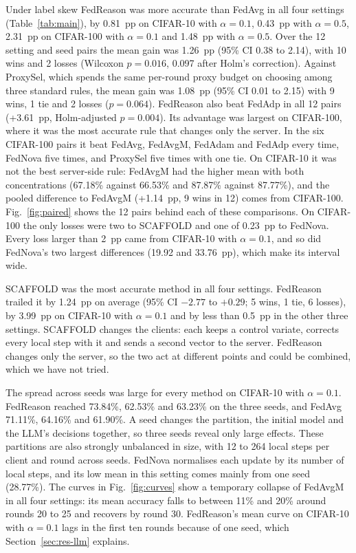 \documentclass[3p,times,a4paper]{elsarticle}
\begin{document}
Under label skew FedReason was more accurate than FedAvg in all four settings (Table~\ref{tab:main}), by 0.81~pp on CIFAR-10 with $\alpha=0.1$, 0.43~pp with $\alpha=0.5$, 2.31~pp on CIFAR-100 with $\alpha=0.1$ and 1.48~pp with $\alpha=0.5$. Over the 12 setting and seed pairs the mean gain was 1.26~pp (95\% CI 0.38 to 2.14), with 10 wins and 2 losses (Wilcoxon $p=0.016$, 0.097 after Holm's correction). Against ProxySel, which spends the same per-round proxy budget on choosing among three standard rules, the mean gain was 1.08~pp (95\% CI 0.01 to 2.15) with 9 wins, 1 tie and 2 losses ($p=0.064$). FedReason also beat FedAdp in all 12 pairs (+3.61~pp, Holm-adjusted $p=0.004$). Its advantage was largest on CIFAR-100, where it was the most accurate rule that changes only the server. In the six CIFAR-100 pairs it beat FedAvg, FedAvgM, FedAdam and FedAdp every time, FedNova five times, and ProxySel five times with one tie. On CIFAR-10 it was not the best server-side rule: FedAvgM had the higher mean with both concentrations (67.18\% against 66.53\% and 87.87\% against 87.77\%), and the pooled difference to FedAvgM (+1.14~pp, 9 wins in 12) comes from CIFAR-100. Fig.~\ref{fig:paired} shows the 12 pairs behind each of these comparisons. On CIFAR-100 the only losses were two to SCAFFOLD and one of 0.23~pp to FedNova. Every loss larger than 2~pp came from CIFAR-10 with $\alpha=0.1$, and so did FedNova's two largest differences (19.92 and 33.76~pp), which make its interval wide.

SCAFFOLD was the most accurate method in all four settings. FedReason trailed it by 1.24~pp on average (95\% CI $-2.77$ to $+0.29$; 5 wins, 1 tie, 6 losses), by 3.99~pp on CIFAR-10 with $\alpha=0.1$ and by less than 0.5~pp in the other three settings. SCAFFOLD changes the clients: each keeps a control variate, corrects every local step with it and sends a second vector to the server. FedReason changes only the server, so the two act at different points and could be combined, which we have not tried.

The spread across seeds was large for every method on CIFAR-10 with $\alpha=0.1$. FedReason reached 73.84\%, 62.53\% and 63.23\% on the three seeds, and FedAvg 71.11\%, 64.16\% and 61.90\%. A seed changes the partition, the initial model and the LLM's decisions together, so three seeds reveal only large effects. These partitions are also strongly unbalanced in size, with 12 to 264 local steps per client and round across seeds. FedNova normalises each update by its number of local steps, and its low mean in this setting comes mainly from one seed (28.77\%). The curves in Fig.~\ref{fig:curves} show a temporary collapse of FedAvgM in all four settings: its mean accuracy falls to between 11\% and 20\% around rounds 20 to 25 and recovers by round 30. FedReason's mean curve on CIFAR-10 with $\alpha=0.1$ lags in the first ten rounds because of one seed, which Section~\ref{sec:res-llm} explains.
\end{document}
